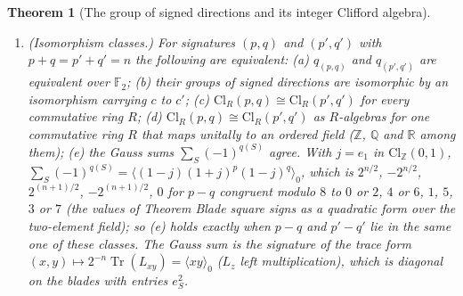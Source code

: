 \documentclass[11pt]{article}
\newtheorem{theorem}{Theorem}[section]
\theoremstyle{definition}
\theoremstyle{plain}
\providecommand{\Cl}{}\renewcommand{\Cl}{\mathrm{Cl}}
\providecommand{\Q}{}\renewcommand{\Q}{\mathbb{Q}}
\providecommand{\R}{}\renewcommand{\R}{\mathbb{R}}
\providecommand{\Tr}{}\renewcommand{\Tr}{\operatorname{Tr}}
\providecommand{\Z}{}\renewcommand{\Z}{\mathbb{Z}}
\begin{document}
\begin{theorem}[The group of signed directions and its integer Clifford algebra]
\begin{enumerate}
\item[(viii)] \emph{(Isomorphism classes.)} For signatures $(p,q)$ and $(p',q')$ with $p + q = p' + q' = n$ the following are equivalent: (a) $q_{(p,q)}$ and $q_{(p',q')}$ are equivalent over $\mathbb{F}_{2}$; (b) their groups of signed directions are isomorphic by an isomorphism carrying $c$ to $c'$; (c) $\Cl_{R}(p,q) \cong \Cl_{R}(p',q')$ for every commutative ring $R$; (d) $\Cl_{R}(p,q) \cong \Cl_{R}(p',q')$ as $R$-algebras for one commutative ring $R$ that maps unitally to an ordered field ($\Z$, $\Q$ and $\R$ among them); (e) the Gauss sums $\sum_{S}(-1)^{q(S)}$ agree. With $j = e_{1}$ in $\Cl_{\Z}(0,1)$, $\sum_{S}(-1)^{q(S)} = \langle (1 - j)(1 + j)^{p}(1 - j)^{q}\rangle_{0}$, which is $2^{n/2}$, $-2^{n/2}$, $2^{(n+1)/2}$, $-2^{(n+1)/2}$, $0$ for $p - q$ congruent modulo $8$ to $0$ or $2$, $4$ or $6$, $1$, $5$, $3$ or $7$ (the values of Theorem \emph{Blade square signs as a quadratic form over the two-element field}); so (e) holds exactly when $p - q$ and $p' - q'$ lie in the same one of these classes. The Gauss sum is the signature of the trace form $(x, y) \mapsto 2^{-n}\Tr(L_{xy}) = \langle xy\rangle_{0}$ ($L_{z}$ left multiplication), which is diagonal on the blades with entries $e_{S}^{2}$.
\end{enumerate}
\end{theorem}
\end{document}
